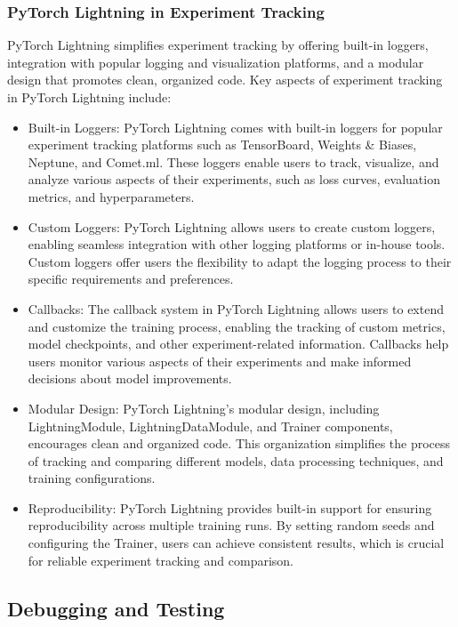 \documentclass[12pt]{article}
\begin{document}
\subsubsection{PyTorch Lightning in Experiment Tracking}

PyTorch Lightning simplifies experiment tracking by offering built-in loggers, integration with popular logging and visualization platforms, and a modular design that promotes clean, organized code. Key aspects of experiment tracking in PyTorch Lightning include:

\begin{itemize}
    \item Built-in Loggers: PyTorch Lightning comes with built-in loggers for popular experiment tracking platforms such as TensorBoard, Weights \& Biases, Neptune, and Comet.ml. These loggers enable users to track, visualize, and analyze various aspects of their experiments, such as loss curves, evaluation metrics, and hyperparameters.
    \item Custom Loggers: PyTorch Lightning allows users to create custom loggers, enabling seamless integration with other logging platforms or in-house tools. Custom loggers offer users the flexibility to adapt the logging process to their specific requirements and preferences.
    \item Callbacks: The callback system in PyTorch Lightning allows users to extend and customize the training process, enabling the tracking of custom metrics, model checkpoints, and other experiment-related information. Callbacks help users monitor various aspects of their experiments and make informed decisions about model improvements.
    \item Modular Design: PyTorch Lightning's modular design, including LightningModule, LightningDataModule, and Trainer components, encourages clean and organized code. This organization simplifies the process of tracking and comparing different models, data processing techniques, and training configurations.
    \item Reproducibility: PyTorch Lightning provides built-in support for ensuring reproducibility across multiple training runs. By setting random seeds and configuring the Trainer, users can achieve consistent results, which is crucial for reliable experiment tracking and comparison.
\end{itemize}

\subsection{Debugging and Testing}
\end{document}
